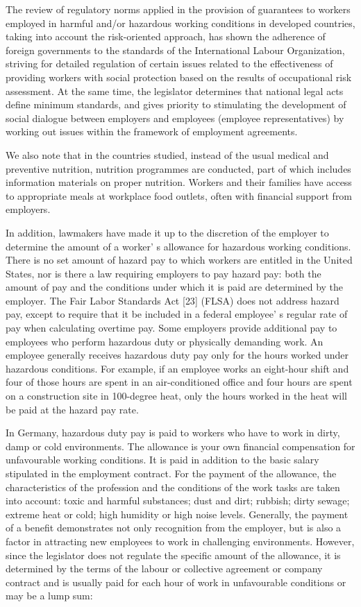 The review of regulatory norms applied in the provision of guarantees to
workers employed in harmful and/or hazardous working conditions in
developed countries, taking into account the risk-oriented approach, has
shown the adherence of foreign governments to the standards of the
International Labour Organization, striving for detailed regulation of
certain issues related to the effectiveness of providing workers with
social protection based on the results of occupational risk assessment.
At the same time, the legislator determines that national legal acts
define minimum standards, and gives priority to stimulating the
development of social dialogue between employers and employees (employee
representatives) by working out issues within the framework of
employment agreements.

We also note that in the countries studied, instead of the usual medical
and preventive nutrition, nutrition programmes are conducted, part of
which includes information materials on proper nutrition. Workers and
their families have access to appropriate meals at workplace food
outlets, often with financial support from employers.

In addition, lawmakers have made it up to the discretion of the employer
to determine the amount of a worker' s allowance for
hazardous working conditions. There is no set amount of hazard pay to
which workers are entitled in the United States, nor is there a law
requiring employers to pay hazard pay: both the amount of pay and the
conditions under which it is paid are determined by the employer. The
Fair Labor Standards Act {[}23{]} (FLSA) does not address hazard pay,
except to require that it be included in a federal
employee' s regular rate of pay when calculating overtime
pay. Some employers provide additional pay to employees who perform
hazardous duty or physically demanding work. An employee generally
receives hazardous duty pay only for the hours worked under hazardous
conditions. For example, if an employee works an eight-hour shift and
four of those hours are spent in an air-conditioned office and four
hours are spent on a construction site in 100-degree heat, only the
hours worked in the heat will be paid at the hazard pay rate.

In Germany, hazardous duty pay is paid to workers who have to work in
dirty, damp or cold environments. The allowance is your own financial
compensation for unfavourable working conditions. It is paid in addition
to the basic salary stipulated in the employment contract. For the
payment of the allowance, the characteristics of the profession and the
conditions of the work tasks are taken into account: toxic and harmful
substances; dust and dirt; rubbish; dirty sewage; extreme heat or cold;
high humidity or high noise levels. Generally, the payment of a benefit
demonstrates not only recognition from the employer, but is also a
factor in attracting new employees to work in challenging environments.
However, since the legislator does not regulate the specific amount of
the allowance, it is determined by the terms of the labour or collective
agreement or company contract and is usually paid for each hour of work
in unfavourable conditions or may be a lump sum:


